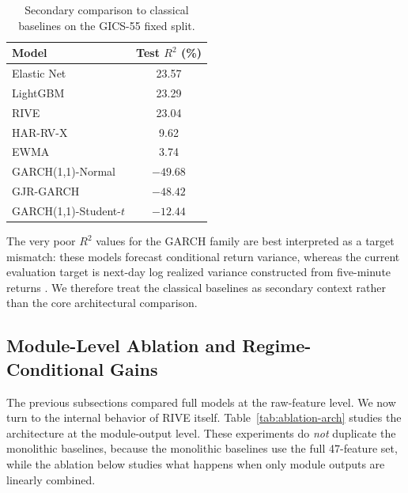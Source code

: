 \documentclass[review]{elsarticle}
\begin{document}
\begin{table}[H]
\centering
\caption{Secondary comparison to classical baselines on the GICS-55 fixed split.}
\label{tab:classical-results}
\begin{tabular}{lc}
\toprule
Model & Test $R^2$ (\%) \\
\midrule
Elastic Net & 23.57 \\
LightGBM & 23.29 \\
RIVE & 23.04 \\
HAR-RV-X & 9.62 \\
EWMA & 3.74 \\
GARCH(1,1)-Normal & $-49.68$ \\
GJR-GARCH & $-48.42$ \\
GARCH(1,1)-Student-$t$ & $-12.44$ \\
\bottomrule
\end{tabular}
\end{table}

The very poor $R^2$ values for the GARCH family are best interpreted as a target mismatch: these models forecast conditional return variance, whereas the current evaluation target is next-day log realized variance constructed from five-minute returns \cite{andersen1998,hansen2005}. We therefore treat the classical baselines as secondary context rather than the core architectural comparison.

\subsection{Module-Level Ablation and Regime-Conditional Gains}\label{sec:ablation}

The previous subsections compared full models at the raw-feature level. We now turn to the internal behavior of RIVE itself. Table~\ref{tab:ablation-arch} studies the architecture at the module-output level. These experiments do \emph{not} duplicate the monolithic baselines, because the monolithic baselines use the full 47-feature set, while the ablation below studies what happens when only module outputs are linearly combined.
\end{document}
